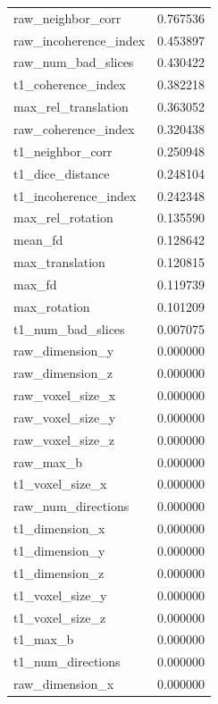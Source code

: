 \documentclass[9pt,lineno]{elife}
\begin{document}
\begin{appendixbox}
\begin{longtable}{lr}
\bottomrule
\endlastfoot
raw\_neighbor\_corr     &                  0.767536 \\
raw\_incoherence\_index &                  0.453897 \\
raw\_num\_bad\_slices    &                  0.430422 \\
t1\_coherence\_index    &                  0.382218 \\
max\_rel\_translation   &                  0.363052 \\
raw\_coherence\_index   &                  0.320438 \\
t1\_neighbor\_corr      &                  0.250948 \\
t1\_dice\_distance      &                  0.248104 \\
t1\_incoherence\_index  &                  0.242348 \\
max\_rel\_rotation      &                  0.135590 \\
mean\_fd               &                  0.128642 \\
max\_translation       &                  0.120815 \\
max\_fd                &                  0.119739 \\
max\_rotation          &                  0.101209 \\
t1\_num\_bad\_slices     &                  0.007075 \\
raw\_dimension\_y       &                  0.000000 \\
raw\_dimension\_z       &                  0.000000 \\
raw\_voxel\_size\_x      &                  0.000000 \\
raw\_voxel\_size\_y      &                  0.000000 \\
raw\_voxel\_size\_z      &                  0.000000 \\
raw\_max\_b             &                  0.000000 \\
t1\_voxel\_size\_x       &                  0.000000 \\
raw\_num\_directions    &                  0.000000 \\
t1\_dimension\_x        &                  0.000000 \\
t1\_dimension\_y        &                  0.000000 \\
t1\_dimension\_z        &                  0.000000 \\
t1\_voxel\_size\_y       &                  0.000000 \\
t1\_voxel\_size\_z       &                  0.000000 \\
t1\_max\_b              &                  0.000000 \\
t1\_num\_directions     &                  0.000000 \\
raw\_dimension\_x       &                  0.000000 \\
\end{longtable}

\end{appendixbox}
\end{document}
